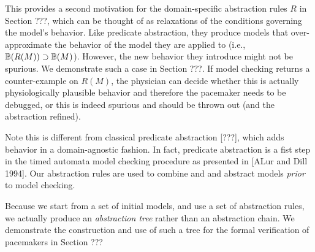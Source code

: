This provides a second motivation for the domain-specific abstraction rules $R$ in Section ???, which can be thought of as relaxations of the conditions governing the model's behavior. 
Like predicate abstraction, they produce models that over-approximate the behavior of the model they are applied to (i.e., $\mathbb{B}(R(M)) \supset \mathbb{B}(M)$).
However, the new behavior they introduce might not be spurious. 
We demonstrate such a case in Section ???.
If model checking returns a counter-example on $R(M)$, the physician can decide whether this is actually physiologically plausible behavior and therefore the pacemaker needs to be debugged, or this is indeed spurious and should be thrown out (and the abstraction refined).

Note this is different from classical predicate abstraction [???], which adds behavior in a domain-agnostic fashion. In fact, predicate abstraction is a fist step in the timed automata model checking procedure as presented in [ALur and Dill 1994].
Our abstraction rules are used to combine and and abstract models \emph{prior} to model checking.
%

Because we start from a set of initial models, and use a set of abstraction rules, we actually produce an \emph{abstraction tree} rather than an abstraction chain.
We demonstrate the construction and use of such a tree for the formal verification of pacemakers in Section ???

